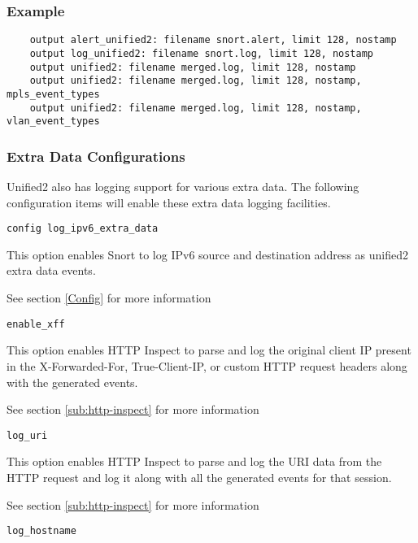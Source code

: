 \documentclass[english]{report}
\begin{document}
\subsubsection{Example}

\begin{verbatim}
    output alert_unified2: filename snort.alert, limit 128, nostamp
    output log_unified2: filename snort.log, limit 128, nostamp
    output unified2: filename merged.log, limit 128, nostamp
    output unified2: filename merged.log, limit 128, nostamp, mpls_event_types
    output unified2: filename merged.log, limit 128, nostamp, vlan_event_types
\end{verbatim}

\subsubsection{Extra Data Configurations}

  Unified2 also has logging support for various extra data. The
  following configuration items will enable these extra data logging
  facilities.

\begin{verbatim}
config log_ipv6_extra_data
\end{verbatim}

This option enables Snort to log IPv6 source and destination
address as unified2 extra data events.

See section \ref{Config} for more information

\begin{verbatim}
enable_xff
\end{verbatim}

This option enables HTTP Inspect to parse and log the original
client IP present in the X-Forwarded-For, True-Client-IP, or custom
HTTP request headers along with the generated events.

See section \ref{sub:http-inspect} for more information

\begin{verbatim}
log_uri
\end{verbatim}

This option enables HTTP Inspect to parse and log the URI data
from the HTTP request and log it along with all the generated
events for that session.

See section \ref{sub:http-inspect} for more information

\begin{verbatim}
log_hostname 
\end{verbatim}
\end{document}
